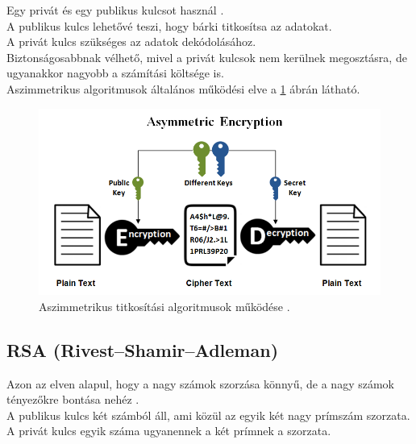 \noindent Egy privát és egy publikus kulcsot használ \cite{yassein2017comprehensive}.
\vspace{5pt} \\A publikus kulcs lehetővé teszi, hogy bárki titkosítsa az adatokat.
\vspace{5pt} \\A privát kulcs szükséges az adatok  dekódolásához. 
\vspace{5pt} \\Biztonságosabbnak vélhető, mivel a privát kulcsok nem kerülnek megosztásra, de ugyanakkor nagyobb a számítási költsége is.\newline
\vspace{5pt}\\ Aszimmetrikus algoritmusok általános működési elve a \ref{fig:asym_encryption} ábrán látható.
\begin{figure}[h]
	\centering
	\includegraphics[scale=0.4]{images/asym.png}
	\caption{Aszimmetrikus titkosítási algoritmusok működése \cite{ssl2buywiki}.}
	\label{fig:asym_encryption}
\end{figure}

\subsection{RSA (Rivest–Shamir–Adleman)}
\noindent Azon az elven alapul, hogy a nagy számok szorzása könnyű, de a nagy számok tényezőkre bontása nehéz \cite{gupta2011ecc}. 
\vspace{5pt}\\ A publikus kulcs két számból áll, ami közül az egyik két nagy prímszám szorzata.
\vspace{5pt}\\ A privát kulcs egyik száma ugyanennek a két prímnek a szorzata.



